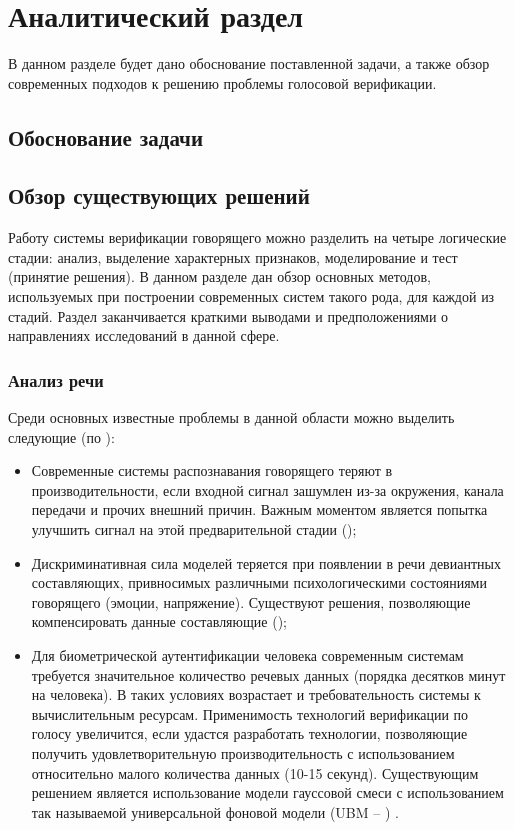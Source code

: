 \chapter{Аналитический раздел}

В данном разделе будет дано обоснование поставленной задачи, а также обзор современных подходов к решению проблемы голосовой верификации.

\section{Обоснование задачи}

\section{Обзор существующих решений}

Работу системы верификации говорящего можно разделить на четыре логические стадии: анализ, выделение характерных признаков, моделирование и тест (принятие решения). В данном разделе дан обзор основных методов, используемых при построении современных систем такого рода, для каждой из стадий. Раздел заканчивается краткими выводами и предположениями о направлениях исследований в данной сфере.

\subsection{Анализ речи}

Среди основных известные проблемы в данной области можно выделить следующие (по \cite{Jayanna09overview}):
\begin{itemize}
\item Современные системы распознавания говорящего теряют в производительности, если входной сигнал зашумлен из-за окружения, канала передачи и прочих внешний причин. Важным моментом является попытка улучшить сигнал на этой предварительной стадии (\cite{});
\item Дискриминативная сила моделей теряется при появлении в речи девиантных составляющих, привносимых различными психологическими состояниями говорящего (эмоции, напряжение). Существуют решения, позволяющие компенсировать данные составляющие (\cite{});
\item Для биометрической аутентификации человека современным системам требуется значительное количество речевых данных (порядка десятков минут на человека). В таких условиях возрастает и требовательность системы к вычислительным ресурсам. Применимость технологий верификации по голосу увеличится, если удастся разработать технологии, позволяющие получить удовлетворительную производительность с использованием относительно малого количества данных (10-15 секунд). Существующим решением является использование модели гауссовой смеси с использованием так называемой универсальной фоновой модели (UBM -- ) \cite{Reynolds00speakerverification}.
\end{itemize}

